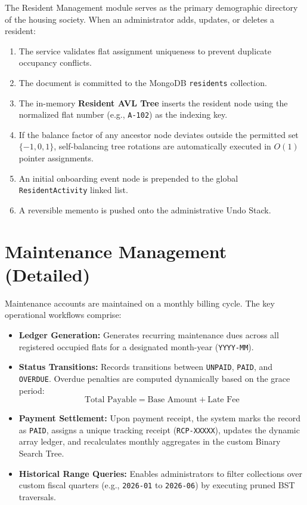\documentclass[12pt,a4paper]{article}
\begin{document}
The Resident Management module serves as the primary demographic directory of the housing society. When an administrator adds, updates, or deletes a resident:
\begin{enumerate}[leftmargin=1.5em]
    \item The service validates flat assignment uniqueness to prevent duplicate occupancy conflicts.
    \item The document is committed to the MongoDB \texttt{residents} collection.
    \item The in-memory \textbf{Resident AVL Tree} inserts the resident node using the normalized flat number (e.g., \texttt{A-102}) as the indexing key.
    \item If the balance factor of any ancestor node deviates outside the permitted set $\{-1, 0, 1\}$, self-balancing tree rotations are automatically executed in $O(1)$ pointer assignments.
    \item An initial onboarding event node is prepended to the global \texttt{ResidentActivity} linked list.
    \item A reversible memento is pushed onto the administrative Undo Stack.
\end{enumerate}

\section{Maintenance Management (Detailed)}

Maintenance accounts are maintained on a monthly billing cycle. The key operational workflows comprise:
\begin{itemize}[leftmargin=1.5em]
    \item \textbf{Ledger Generation:} Generates recurring maintenance dues across all registered occupied flats for a designated month-year (\texttt{YYYY-MM}).
    \item \textbf{Status Transitions:} Records transitions between \texttt{UNPAID}, \texttt{PAID}, and \texttt{OVERDUE}. Overdue penalties are computed dynamically based on the grace period:
    \begin{equation}
        \text{Total Payable} = \text{Base Amount} + \text{Late Fee}
    \end{equation}
    \item \textbf{Payment Settlement:} Upon payment receipt, the system marks the record as \texttt{PAID}, assigns a unique tracking receipt (\texttt{RCP-XXXXX}), updates the dynamic array ledger, and recalculates monthly aggregates in the custom Binary Search Tree.
    \item \textbf{Historical Range Queries:} Enables administrators to filter collections over custom fiscal quarters (e.g., \texttt{2026-01} to \texttt{2026-06}) by executing pruned BST traversals.
\end{itemize}
\end{document}
